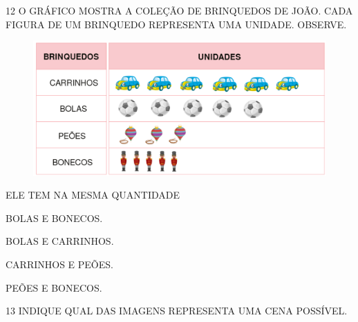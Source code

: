 \num{12} O GRÁFICO MOSTRA A COLEÇÃO DE BRINQUEDOS DE JOÃO. CADA FIGURA DE UM
BRINQUEDO REPRESENTA UMA UNIDADE. OBSERVE.

\begin{figure}[H]
\includegraphics[width=\textwidth]{./media/SAEB_1ANO_MAT_FIGURA126.png}
\end{figure}

ELE TEM NA MESMA QUANTIDADE

\begin{multicols}{2}
\begin{escolha}[itemsep=0pt]
\item BOLAS E BONECOS.

\item BOLAS E CARRINHOS.

\item CARRINHOS E PEÕES.

\item PEÕES E BONECOS.
\end{escolha}
\end{multicols}

\pagebreak

\num{13} INDIQUE QUAL DAS IMAGENS REPRESENTA UMA CENA POSSÍVEL.


